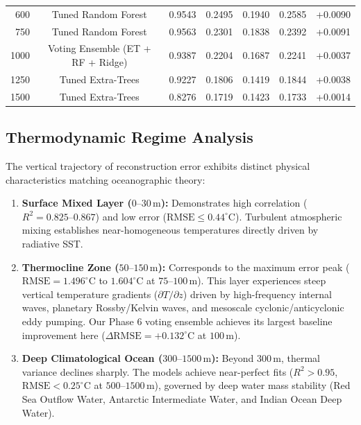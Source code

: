 \documentclass[conference]{IEEEtran}
\begin{document}
\begin{table}[t]
\begin{tabular}{@{}rcccccc@{}}
600  & Tuned Random Forest               & 0.9543 & 0.2495 & 0.1940 & 0.2585 & +0.0090 \\
750  & Tuned Random Forest               & 0.9563 & 0.2301 & 0.1838 & 0.2392 & +0.0091 \\
1000 & Voting Ensemble (ET + RF + Ridge) & 0.9387 & 0.2204 & 0.1687 & 0.2241 & +0.0037 \\
1250 & Tuned Extra-Trees                 & 0.9227 & 0.1806 & 0.1419 & 0.1844 & +0.0038 \\
1500 & Tuned Extra-Trees                 & 0.8276 & 0.1719 & 0.1423 & 0.1733 & +0.0014 \\
\bottomrule
\end{tabular}
\end{table}

\subsection{Thermodynamic Regime Analysis}
The vertical trajectory of reconstruction error exhibits distinct physical characteristics matching oceanographic theory:
\begin{enumerate}
    \item \textbf{Surface Mixed Layer ($0\text{--}30\,\text{m}$):} Demonstrates high correlation ($R^2 = 0.825\text{--}0.867$) and low error ($\text{RMSE} \le 0.44^\circ\text{C}$). Turbulent atmospheric mixing establishes near-homogeneous temperatures directly driven by radiative SST.
    \item \textbf{Thermocline Zone ($50\text{--}150\,\text{m}$):} Corresponds to the maximum error peak ($\text{RMSE} = 1.496^\circ\text{C}$ to $1.604^\circ\text{C}$ at $75\text{--}100\,\text{m}$). This layer experiences steep vertical temperature gradients ($\partial T / \partial z$) driven by high-frequency internal waves, planetary Rossby/Kelvin waves, and mesoscale cyclonic/anticyclonic eddy pumping. Our Phase 6 voting ensemble achieves its largest baseline improvement here ($\Delta\text{RMSE} = +0.132^\circ\text{C}$ at $100\,\text{m}$).
    \item \textbf{Deep Climatological Ocean ($300\text{--}1500\,\text{m}$):} Beyond $300\,\text{m}$, thermal variance declines sharply. The models achieve near-perfect fits ($R^2 > 0.95$, $\text{RMSE} < 0.25^\circ\text{C}$ at $500\text{--}1500\,\text{m}$), governed by deep water mass stability (Red Sea Outflow Water, Antarctic Intermediate Water, and Indian Ocean Deep Water).
\end{enumerate}
\end{document}
